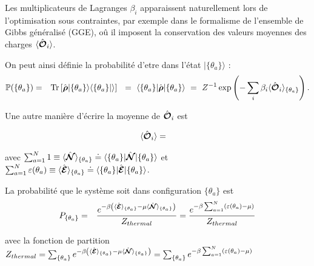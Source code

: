 Les multiplicateurs de Lagranges $\beta_i$ apparaissent naturellement lors de l'optimisation sous contraintes, par exemple dans le formalisme de l'ensemble de Gibbs généralisé (GGE), oû il imposent la conservation des valeurs moyennes des charges $\langle \hat{\bm{\mathcal{O}}}_i \rangle$.

On peut ainsi définie la probabilité d'etre dans l'état $\vert \{ \theta_a \} \rangle$ :
\begin{eqnarray}
	\mathbb{P} ( \{ \theta_a \} ) & = & \mathrm{Tr} \left [\operator{\rho} \vert \{ \theta_a \} \rangle \langle \{ \theta_a \} \vert \rangle \right ] ~=~  \langle \{ \theta_a \} \vert	\operator{\rho} \vert \{ \theta_a \} \rangle ~=~ Z^{-1} \exp \left (- \sum_i \beta_i \langle\operator{\mathcal{O}}_i\rangle_{\{\theta_a\}} \right ) .
\end{eqnarray}

Une autre manière d'écrire la moyenne de $\hat{\bm{\mathcal{O}}}_i$ est 

\begin{eqnarray}
	\langle \hat{\bm{\mathcal{O}}}_i \rangle &= & 		
\end{eqnarray}




 



	
	avec $\sum_{a = 1}^N 1 \equiv \langle \hat{\bm{\mathcal{N}}} \rangle_{ \{\theta_a \} }  \doteq  \langle \{ \theta_a \}\vert  \hat{\bm{\mathcal{N}}} \vert\{ \theta_a\}\rangle  $ et $  \sum_{a = 1}^N  \varepsilon ( \theta_a ) \equiv \langle \hat{\bm{\mathcal{E}}} \rangle_{\{\theta_a \}}  \doteq  \langle \{ \theta_a \}\vert  \hat{\bm{ \mathcal{E}}}  \vert\{ \theta_a\}\rangle $.

	
	La probabilité que le système soit dans configuration $\{ \theta_a \}$  est 
	\begin{eqnarray}
		P_{\{\theta_a \}} & = & \frac{e^{- \beta \left ( \langle \hat{\bm{\mathcal{E}}} \rangle_{\{\theta_a \}}   - \mu \langle \hat{\bm{\mathcal{N}}} \rangle_{\{\theta_a \}} \right )}}{Z_{thermal}} = \frac{e^{- \beta \sum_{a=1}^N  ( \varepsilon( \theta_a )   - \mu  )}}{Z_{thermal}}	
	\end{eqnarray}
	
	avec la fonction de partition $Z_{thermal} = \sum_{\{ \theta_a\}}e^{- \beta \left ( \langle \hat{\bm{\mathcal{E}}} \rangle_{\{\theta_a \}}   - \mu \langle \hat{\bm{\mathcal{N}}} \rangle_{\{\theta_a \}} \right )} = \sum_{\{ \theta_a\}} e^{- \beta \sum_{a=1}^N  ( \varepsilon( \theta_a )   - \mu  )}$
	
